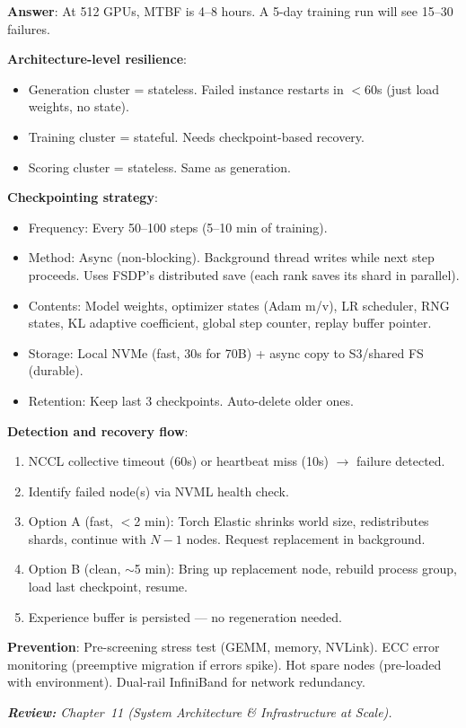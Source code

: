 \begin{questionbox}
\textbf{Answer}: At 512 GPUs, MTBF is 4--8 hours. A 5-day training run will see 15--30 failures.

\textbf{Architecture-level resilience}:

\begin{itemize}
  \item Generation cluster = stateless. Failed instance restarts in $<$60s (just load weights, no state).
  \item Training cluster = stateful. Needs checkpoint-based recovery.
  \item Scoring cluster = stateless. Same as generation.
\end{itemize}

\textbf{Checkpointing strategy}:

\begin{itemize}
  \item Frequency: Every 50--100 steps (5--10 min of training).
  \item Method: Async (non-blocking). Background thread writes while next step proceeds. Uses FSDP’s distributed save (each rank saves its shard in parallel).
  \item Contents: Model weights, optimizer states (Adam m/v), LR scheduler, RNG states, KL adaptive coefficient, global step counter, replay buffer pointer.
  \item Storage: Local NVMe (fast, 30s for 70B) + async copy to S3/shared FS (durable).
  \item Retention: Keep last 3 checkpoints. Auto-delete older ones.
\end{itemize}

\textbf{Detection and recovery flow}:

\begin{enumerate}
  \item NCCL collective timeout (60s) or heartbeat miss (10s) $\rightarrow$ failure detected.
  \item Identify failed node(s) via NVML health check.
  \item Option A (fast, $<$2 min): Torch Elastic shrinks world size, redistributes shards, continue with $N-1$ nodes. Request replacement in background.
  \item Option B (clean, $\sim$5 min): Bring up replacement node, rebuild process group, load last checkpoint, resume.
  \item Experience buffer is persisted --- no regeneration needed.
\end{enumerate}

\textbf{Prevention}: Pre-screening stress test (GEMM, memory, NVLink). ECC error monitoring (preemptive migration if errors spike). Hot spare nodes (pre-loaded with environment). Dual-rail InfiniBand for network redundancy.

\emph{\textbf{Review:} Chapter~11 (System Architecture \& Infrastructure at Scale).}
\end{questionbox}

